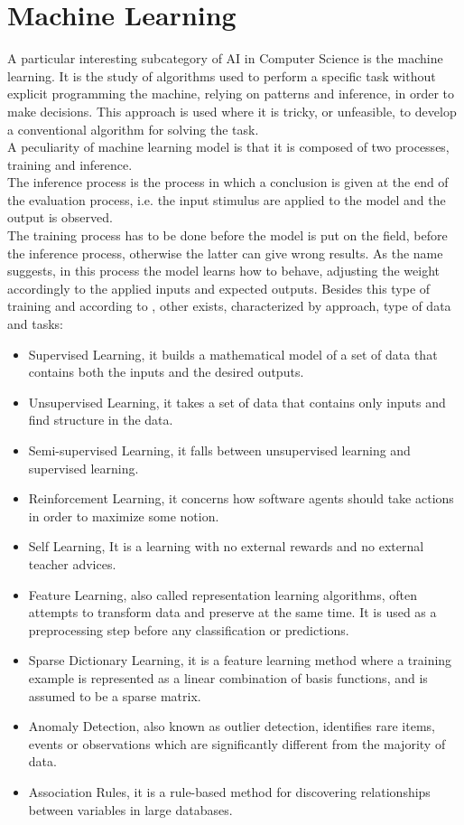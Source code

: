 \section{Machine Learning}
A particular interesting subcategory of AI in Computer Science is the machine learning. It is the study of algorithms used to perform a specific task without explicit programming the machine, relying on patterns and inference, in order to make decisions. This approach is used where it is tricky, or unfeasible, to develop a conventional algorithm for solving the task.\\

A peculiarity of machine learning model is that it is composed of two processes, training and inference.\\
The inference process is the process in which a conclusion is given at the end of the evaluation process, i.e. the input stimulus are applied to the model and the output is observed.\\
The training process has to be done before the model is put on the field, before the inference process, otherwise the latter can give wrong results. As the name suggests, in this process the model learns how to behave, adjusting the weight accordingly to the applied inputs and expected outputs. Besides this type of training and according to \cite{book:1}, other exists, characterized by approach, type of data and tasks:
\begin{itemize}
\item Supervised Learning, it builds a mathematical model of a set of data that contains both the inputs and the desired outputs.
\item Unsupervised Learning, it takes a set of data that contains only inputs and find structure in the data.
\item Semi-supervised Learning, it falls between unsupervised learning and supervised learning.
\item Reinforcement Learning, it concerns how software agents should take actions in order to maximize some notion.
\item Self Learning, It is a learning with no external rewards and no external teacher advices.
\item Feature Learning, also called representation learning algorithms, often attempts to transform data and preserve at the same time. It is used as a preprocessing step before any classification or predictions.
\item Sparse Dictionary Learning, it is a feature learning method where a training example is represented as a linear combination of basis functions, and is assumed to be a sparse matrix.
\item Anomaly Detection, also known as outlier detection,
identifies rare items, events or observations which are significantly different from the majority of data.
\item Association Rules, it is a rule-based method for discovering relationships between variables in large databases.
\end{itemize}

